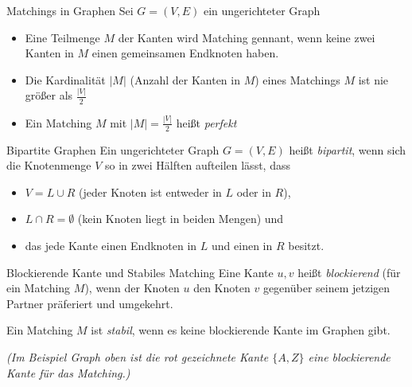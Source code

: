 \documentclass{panikzettel}
\begin{document}

\begin{halfboxl}
	\vspace{-\baselineskip}
	\begin{defi}{Matchings in Graphen}
	Sei $G = (V,E)$ ein ungerichteter Graph\\
	
	\begin{itemize}
	\item Eine Teilmenge $M$ der Kanten wird Matching gennant, wenn keine zwei Kanten in $M$ einen gemeinsamen Endknoten haben.
	
	\item Die Kardinalität $|M|$ (Anzahl der Kanten in $M$) eines Matchings $M$ ist nie größer als $\frac{|V|}{2}$
	
	\item Ein Matching $M$ mit $|M| = \frac{|V|}{2}$ heißt \emph{perfekt}
	
	\end{itemize}
	\end{defi}
\end{halfboxl}%
\begin{halfboxr}
	\vspace{-\baselineskip}
	\begin{defi}{Bipartite Graphen}
	Ein ungerichteter Graph $G = (V,E)$ heißt \emph{bipartit}, wenn sich die Knotenmenge $V$ so in zwei Hälften aufteilen lässt, dass\\
	
	\begin{itemize}
		\item $V = L \cup R$ (jeder Knoten ist entweder in $L$ oder in $R$),
		\item $L \cap R = \emptyset$ (kein Knoten liegt in beiden Mengen) und 
		\item das jede Kante einen Endknoten in $L$ und einen in $R$ besitzt.
	\end{itemize}
	\end{defi}
\end{halfboxr}

\begin{defi}{Blockierende Kante und Stabiles Matching}
	Eine Kante ${u,v}$ heißt \emph{blockierend} (für ein Matching $M$), wenn der Knoten $u$ den Knoten $v$ gegenüber seinem jetzigen Partner präferiert und umgekehrt.
	
	Ein Matching $M$ ist \emph{stabil}, wenn es keine blockierende Kante im Graphen gibt.
	
	\textit{(Im Beispiel Graph oben ist die rot gezeichnete Kante $\{A,Z\}$ eine blockierende Kante für das Matching.)}
\end{defi}
\end{document}
